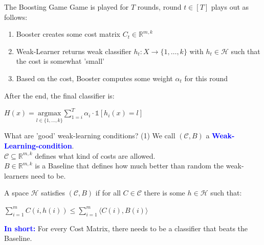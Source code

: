 \documentclass{beamer}
\begin{document}
\begin{frame}{The Boosting Game}
    Game is played for $T$ rounds, round $t \in [T]$ plays out as follows:
    \bigbreak
    \begin{enumerate}
        \item Booster creates some cost matrix $C_t \in \mathbb{R}^{m,k}$
        \item Weak-Learner returns weak classifier $h_t: X \rightarrow \{1, \dots ,k\}$ with $h_t \in \mathcal{H}$ such that the cost is somewhat 'small'
        \item Based on the cost, Booster computes some weight $\alpha_t$ for this round
    \end{enumerate}
    \bigbreak

    After the end, the final classifier is:
    \begin{center}
        $H(x) = \underset{l \in \{1,...,k\}}{\text{argmax}} \sum_{1 = i}^{T} \alpha_i \cdot \mathds{1} [h_i(x) = l]$
    \end{center}
\end{frame}


\begin{frame}{What are 'good' weak-learning conditions? (1)}
    We call  $(\mathcal{C}, B)$ a \textbf{\textcolor{blue}{Weak-Learning-condition}}. \\
    $\mathcal{C} \subseteq \mathbb{R}^{m,k}$ defines what kind of costs are allowed. \\
    $B \in \mathbb{R}^{m,k}$ is a Baseline that defines how much better than random the weak-learners need to be.

    \bigbreak

    A space $\mathcal{H}$ satisfies $(\mathcal{C},B)$ if for all $C \in \mathcal{C}$ there is some $h \in \mathcal{H}$ such that:
    \begin{center}
        $\sum_{i = 1}^{m} C(i, h(i)) \leq \sum_{i = 1}^{m} \langle C(i), B(i)\rangle$ \\
    \end{center}
    \bigbreak
    \textbf{\textcolor{blue}{In short:}} For every Cost Matrix, there needs to be a classifier that beats the Baseline.
\end{frame}
\end{document}
